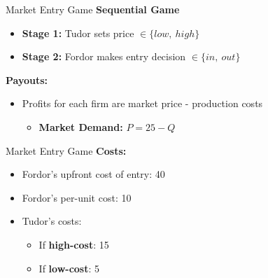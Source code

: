 
\begin{frame}{Market Entry Game}
  \textbf{Sequential Game}
  \begin{itemize}
    \item \textbf{Stage 1:} Tudor sets price $\in \{ low,~high \}$ 
    \item \textbf{Stage 2:} Fordor makes entry decision $\in \{ in,~out \}$
  \end{itemize} 
  \textbf{Payouts:}
  \begin{itemize}
    \item Profits for each firm are market price - production costs
    \begin{itemize}
      \item \textbf{Market Demand:} $P = 25 - Q$ 
    \end{itemize}
  \end{itemize}
\end{frame}


\begin{frame}{Market Entry Game}
  \textbf{Costs:}
  \begin{itemize}
    \item \alert{Fordor}'s upfront cost of entry: 40 
    \item \alert{Fordor}'s per-unit cost: 10
    \item \alert{Tudor}'s costs:
    \begin{itemize}
      \item If \textbf{high-cost}: 15
      \item If \textbf{low-cost}:  5
    \end{itemize}
  \end{itemize}
\end{frame}


